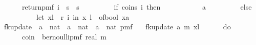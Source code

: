\begin{isabellebody}
\ \ \ \ \ \ return{\isacharunderscore}{\kern0pt}pmf\ {\isacharparenleft}{\kern0pt}{\isasymlambda}i\ {\isasymin}\ {\isacharbraceleft}{\kern0pt}{}{\isachardot}{\kern0pt}{\isachardot}{\kern0pt}{\isacharless}{\kern0pt}s\ {\isasymtimes}\ {\isacharbraceleft}{\kern0pt}{}{\isachardot}{\kern0pt}{\isachardot}{\kern0pt}{\isacharless}{\kern0pt}s\ \isanewline
\ \ \ \ \ \ \ \ if\ coins\ i\ then\ \isanewline
\ \ \ \ \ \ \ \ \ \ {\isacharparenleft}{\kern0pt}a{\isacharcomma}{\kern0pt}{}{\isacharparenright}{\kern0pt}\ \isanewline
\ \ \ \ \ \ \ \ else\ {\isacharparenleft}{\kern0pt}\isanewline
\ \ \ \ \ \ \ \ \ \ let\ {\isacharparenleft}{\kern0pt}x{\isacharcomma}{\kern0pt}l{\isacharparenright}{\kern0pt}\ {\isacharequal}{\kern0pt}\ r\ i\ in\ {\isacharparenleft}{\kern0pt}x{\isacharcomma}{\kern0pt}\ l\ {\isacharplus}{\kern0pt}\ of{\isacharunderscore}{\kern0pt}bool\ {\isacharparenleft}{\kern0pt}x{\isacharequal}{\kern0pt}a{\isacharparenright}{\kern0pt}{\isacharparenright}{\kern0pt}\isanewline
\ \ \ \ \ \ \ \ {\isacharparenright}{\kern0pt}\isanewline
\ \ \ \ \ \ {\isacharparenright}{\kern0pt}\isanewline
\ \ \ \ {\isacharbraceright}{\kern0pt}{\isachardoublequoteclose}\isanewline
\isanewline
{}\isamarkupfalse%
\ fk{\isacharunderscore}{\kern0pt}update{\isacharprime}{\kern0pt}{\isacharprime}{\kern0pt}\ {\isacharcolon}{\kern0pt}{\isacharcolon}{\kern0pt}\ {\isachardoublequoteopen}{\isacharprime}{\kern0pt}a\ {\isasymRightarrow}\ nat\ {\isasymRightarrow}\ {\isacharparenleft}{\kern0pt}{\isacharprime}{\kern0pt}a\ {\isasymtimes}\ nat{\isacharparenright}{\kern0pt}\ {\isasymRightarrow}\ {\isacharparenleft}{\kern0pt}{\isacharparenleft}{\kern0pt}{\isacharprime}{\kern0pt}a\ {\isasymtimes}\ nat{\isacharparenright}{\kern0pt}{\isacharparenright}{\kern0pt}\ pmf{\isachardoublequoteclose}\ \isanewline
\ \ {\isachardoublequoteopen}fk{\isacharunderscore}{\kern0pt}update{\isacharprime}{\kern0pt}{\isacharprime}{\kern0pt}\ a\ m\ {\isacharparenleft}{\kern0pt}x{\isacharcomma}{\kern0pt}l{\isacharparenright}{\kern0pt}\ {\isacharequal}{\kern0pt}\ \isanewline
\ \ \ \ do\ {\isacharbraceleft}{\kern0pt}\isanewline
\ \ \ \ \ \ coin\ {\isasymleftarrow}\ bernoulli{\isacharunderscore}{\kern0pt}pmf\ {\isacharparenleft}{\kern0pt}{}{\isacharslash}{\kern0pt}{\isacharparenleft}{\kern0pt}real\ m{\isacharplus}{\kern0pt}{}{\isacharparenright}{\kern0pt}{\isacharparenright}{\kern0pt}{\isacharsemicolon}{\kern0pt}\isanewline

\end{isabellebody}

